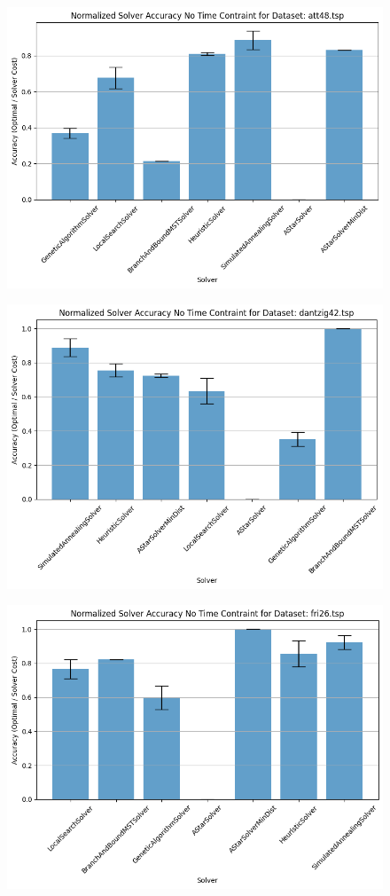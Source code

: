 \documentclass[11pt]{article}
\begin{document}
	
	\begin{figure}[H]
		\centering
		\includegraphics[width=0.7\linewidth]{figures/accuracy_bar_time0_att48.tsp}
		\caption{}
		\label{fig:accuracybartime0att48}
	\end{figure}
	\begin{figure}[H]
		\centering
		\includegraphics[width=0.7\linewidth]{figures/accuracy_bar_time0_dantzig42.tsp}
		\caption{}
		\label{fig:accuracybartime0dantzig42}
	\end{figure}
	\begin{figure}[H]
		\centering
		\includegraphics[width=0.7\linewidth]{figures/accuracy_bar_time0_fri26.tsp}
		\caption{}
		\label{fig:accuracybartime0fri26}
	\end{figure}
\end{document}
